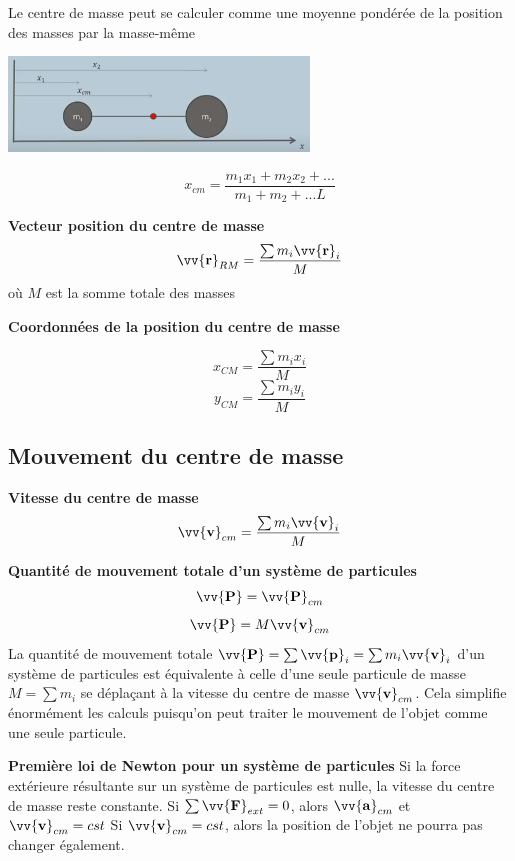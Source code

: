 \documentclass{article}
\begin{document}
Le centre de masse peut se calculer comme une moyenne pondérée de la position des masses par la masse-même
\begin{center}
    \includegraphics[width=8cm]{Image/CentreMasseFormule.png}
\end{center}
\[x_{cm} = \frac{m_1x_1 + m_2x_2 + ...}{m_1 + m_2 + ...L}\]
\newline

\noindent
\textbf{Vecteur position du centre de masse}
\[\vv{\mathbf{r}}_{RM} = \frac{\sum m_i\vv{\mathbf{r}}_i}{M}\]
où $M$ est la somme totale des masses
\newline

\noindent
\textbf{Coordonnées de la position du centre de masse}

\[x_{CM} = \frac{\sum m_ix_i}{M}\]
\[y_{CM} = \frac{\sum m_iy_i}{M}\]

\subsection{Mouvement du centre de masse}
\textbf{Vitesse du centre de masse}
\[\vv{\mathbf{v}}_{cm} = \frac{\sum m_i\vv{\mathbf{v}}_i}{M}\]
\newline

\noindent
\textbf{Quantité de mouvement totale d'un système de particules}
\[\vv{\mathbf{P}} = \vv{\mathbf{P}}_{cm}\]
\[\vv{\mathbf{P}} = M\vv{\mathbf{v}}_{cm}\]
La quantité de mouvement totale $\vv{\mathbf{P}} = \sum\vv{\mathbf{p}}_i = \sum m_i\vv{\mathbf{v}}_i$ d'un système de particules est équivalente à celle d'une seule particule de masse $M = \sum m_i$ se déplaçant à la vitesse du centre de masse $\vv{\mathbf{v}}_{cm}$. Cela simplifie énormément les calculs puisqu'on peut traiter le mouvement de l'objet comme une seule particule.
\newline

\noindent
\textbf{Première loi de Newton pour un système de particules}
\newline
Si la force extérieure résultante sur un système de particules est nulle, la vitesse du centre de masse reste constante.
\newline
Si $\sum \vv{\mathbf{F}}_{ext} = 0$, alors $\vv{\mathbf{a}}_{cm}$ et $\vv{\mathbf{v}}_{cm} = cst$ 
\newline
Si $\vv{\mathbf{v}}_{cm} = cst$, alors la position de l'objet ne pourra pas changer également.
\newline
\end{document}
